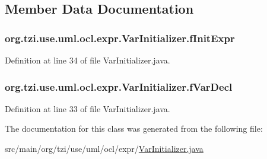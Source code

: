 \subsection{Member Data Documentation}
\hypertarget{classorg_1_1tzi_1_1use_1_1uml_1_1ocl_1_1expr_1_1_var_initializer_ab2b85df1f5b7d70530f51840528e855e}{
\subsubsection[{f\-Init\-Expr}]{ org.\-tzi.\-use.\-uml.\-ocl.\-expr.\-Var\-Initializer.\-f\-Init\-Expr\hspace{0.3cm}{\ttfamily [protected]}}}\label{classorg_1_1tzi_1_1use_1_1uml_1_1ocl_1_1expr_1_1_var_initializer_ab2b85df1f5b7d70530f51840528e855e}


Definition at line 34 of file Var\-Initializer.\-java.

\hypertarget{classorg_1_1tzi_1_1use_1_1uml_1_1ocl_1_1expr_1_1_var_initializer_a60e1e81a0eb352cdf7a4c4fe11e27110}{
\subsubsection[{f\-Var\-Decl}]{ org.\-tzi.\-use.\-uml.\-ocl.\-expr.\-Var\-Initializer.\-f\-Var\-Decl\hspace{0.3cm}{\ttfamily [protected]}}}\label{classorg_1_1tzi_1_1use_1_1uml_1_1ocl_1_1expr_1_1_var_initializer_a60e1e81a0eb352cdf7a4c4fe11e27110}


Definition at line 33 of file Var\-Initializer.\-java.



The documentation for this class was generated from the following file\-:\begin{DoxyCompactItemize}
\item 
src/main/org/tzi/use/uml/ocl/expr/\hyperlink{_var_initializer_8java}{Var\-Initializer.\-java}\end{DoxyCompactItemize}
